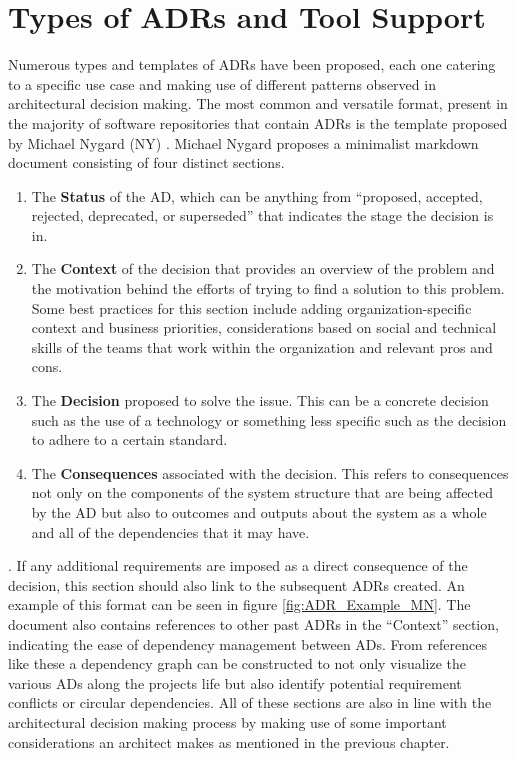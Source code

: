     \section{Types of ADRs and Tool Support}
        Numerous types and templates of ADRs have been proposed, each one catering to a specific use case and making use of different patterns observed in architectural decision making. The most common and versatile format, present in the majority of software repositories that contain ADRs is the template proposed by Michael Nygard (NY) \cite{Github_study_ADRs}. Michael Nygard proposes a minimalist markdown document consisting of four distinct sections.
        \begin{enumerate}
        \item The \textbf{Status} of the AD, which can be anything from ``proposed, accepted, rejected, deprecated, or superseded'' that indicates the stage the decision is in.
        \item The \textbf{Context} of the decision that provides an overview of the problem and the motivation behind the efforts of trying to find a solution to this problem. Some best practices for this section include adding organization-specific context and business priorities, considerations based on social and technical skills of the teams that work within the organization and relevant pros and cons.
        \item The \textbf{Decision} proposed to solve the issue. This can be a concrete decision such as the use of a technology or something less specific such as the decision to adhere to a certain standard.
        \item The \textbf{Consequences} associated with the decision. This refers to consequences not only on the components of the system structure that are being affected by the AD but also to outcomes and outputs about the system as a whole and all of the dependencies that it may have.
        \end{enumerate}. 
        If any additional requirements are imposed as a direct consequence of the decision, this section should also link to the subsequent ADRs created.
        An example of this format can be seen in figure \ref{fig:ADR_Example_MN}. The document also contains references to other past ADRs in the ``Context'' section, indicating the ease of dependency management between ADs. From references like these a dependency graph can be constructed to not only visualize the various ADs along the projects life but also identify potential requirement conflicts or circular dependencies. All of these sections are also in line with the architectural decision making process by making use of some important considerations an architect makes as mentioned in the previous chapter. 

